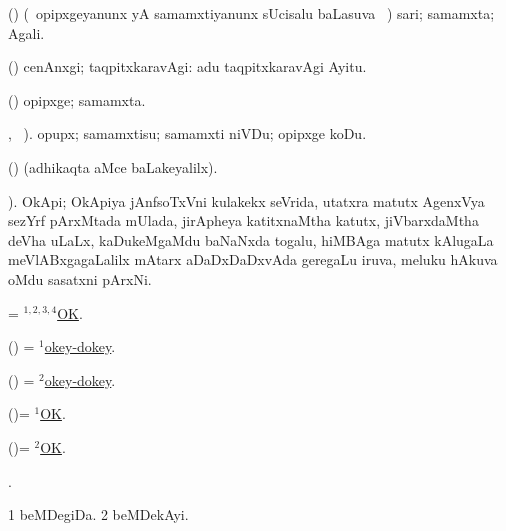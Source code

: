 \bentry
{}
\gl{\gu}
\bmng
(\AmA) (\sA\ opipxgeyanunx yA samamxtiyanunx sUcisalu baLasuva \BAavayx\ ) sari; samamxta; Agali. 
\emng
\eentry

\bentry
{}
\gl{\kirxvi}
\bmng
(\AmA) cenAnxgi; taqpitxkaravAgi:  adu taqpitxkaravAgi Ayitu. 
\emng
\eentry

\bentry
{}
\gl{\nA}
\bmng
(\AmA) opipxge; samamxta. 
\emng
\eentry

\bentry
{}
\gl{\sakirx}
, \vakaq\ ).\bmng
opupx; samamxtisu; samamxti niVDu; opipxge koDu. 
\emng
\eentry

\bentry
{}
\gl{\saMkiSx}
\bmng
(\ame)  (adhikaqta aMce baLakeyalilx). 
\emng
\eentry

\bentry
{}
\gl{\nA}
). \bmng
OkApi; OkApiya jAnfsoTxVni kulakekx seVrida, utatxra matutx AgenxVya sezYrf pArxMtada mUlada, jirApheya katitxnaMtha katutx, jiVbarxdaMtha deVha uLaLx, kaDukeMgaMdu baNaNxda togalu, hiMBAga matutx kAlugaLa meVlABxgagaLalilx mAtarx aDaDxDaDxvAda geregaLu iruva, meluku hAkuva oMdu sasatxni pArxNi.  
\emng
\eentry

\bentry
{}
\gl{}
\bmng
= \hyperlink{OK(1)}{$^{1,2,3,4}$OK}. 
\emng
\eentry

\bentry
{}
\gl{\gu}
\bmng
(\ashi) = \hyperlink{okey-dokey(1)}{$^1$okey-dokey}. 
\emng
\eentry

\bentry
{}
\gl{\kirxvi}
\bmng
(\ashi) = \hyperlink{okey-dokey(2)}{$^2$okey-dokey}. 
\emng
\eentry

\bentry
{}
\gl{\gu}
\bmng
(\ashi)= \hyperlink{OK(1)}{$^1$OK}. 
\emng
\eentry

\bentry
{}
\gl{\kirxvi}
\bmng
(\ashi)= \hyperlink{OK(2)}{$^2$OK}. 
\emng
\eentry

\bentry
{}
\gl{\saMkiSx}
\bmng
{}. 
\emng
\eentry

\bentry
{}
\gl{\nA}
\bmng
\bnum
\num{1} beMDegiDa. 
\num{2} beMDekAyi. 
\enum
\emng
\eentry

